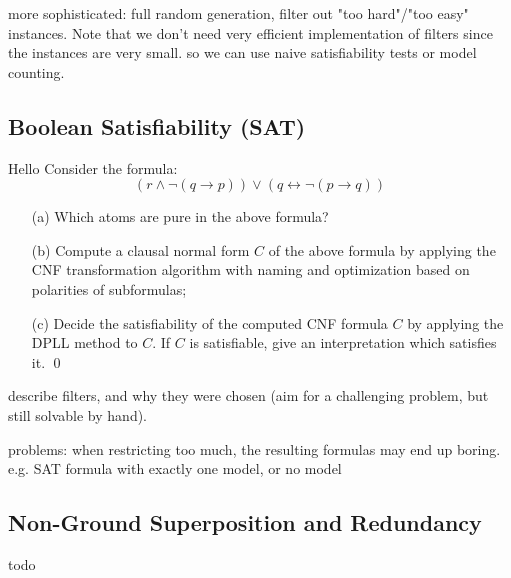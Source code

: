 more sophisticated: full random generation, filter out "too hard"/"too easy" instances.
Note that we don't need very efficient implementation of filters since the instances are very small.
so we can use naive satisfiability tests or model counting.

\subsection{Boolean Satisfiability (SAT)}

\begin{mdframed}
\begin{example}[SAT]
    Hello
Consider the formula:
\[
( r \land \lnot ( q \rightarrow p ) ) \lor ( q \leftrightarrow \lnot ( p \rightarrow q ) )
\]
\begin{itemize}
\item[(a)]
Which atoms are pure in the above formula?
\item[(b)] Compute a clausal normal form $C$ of the above formula by
  applying the CNF transformation algorithm with naming and
  optimization based on polarities of subformulas;
\item[(c)] Decide the satisfiability of the computed CNF formula $C$
  by applying  the DPLL method to $C$. If $C$ is
satisfiable,  give an interpretation which
satisfies it.
    \qed
\end{itemize}
\end{example}
\end{mdframed}

describe filters, and why they were chosen (aim for a challenging problem, but still solvable by hand).

problems:
when restricting too much, the resulting formulas may end up boring.
e.g. SAT formula with exactly one model, or no model


\subsection{Non-Ground Superposition and Redundancy}

todo



